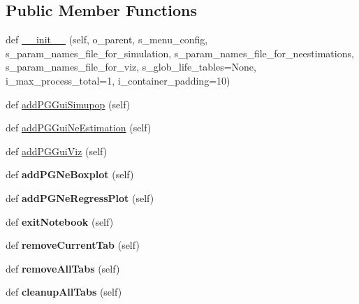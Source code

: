 \subsection*{Public Member Functions}
\begin{DoxyCompactItemize}
\item 
def \hyperlink{classnegui_1_1pghostnotebook_1_1PGHostNotebook_a6d20a73586735a59007c1159361fe000}{\+\_\+\+\_\+init\+\_\+\+\_\+} (self, o\+\_\+parent, s\+\_\+menu\+\_\+config, s\+\_\+param\+\_\+names\+\_\+file\+\_\+for\+\_\+simulation, s\+\_\+param\+\_\+names\+\_\+file\+\_\+for\+\_\+neestimations, s\+\_\+param\+\_\+names\+\_\+file\+\_\+for\+\_\+viz, s\+\_\+glob\+\_\+life\+\_\+tables=None, i\+\_\+max\+\_\+process\+\_\+total=1, i\+\_\+container\+\_\+padding=10)
\item 
def \hyperlink{classnegui_1_1pghostnotebook_1_1PGHostNotebook_af595ed4592e623ef403a5e9e7c1e930e}{add\+P\+G\+Gui\+Simupop} (self)
\item 
def \hyperlink{classnegui_1_1pghostnotebook_1_1PGHostNotebook_a9242f6b6eff030ac5de8db425e1585f9}{add\+P\+G\+Gui\+Ne\+Estimation} (self)
\item 
def \hyperlink{classnegui_1_1pghostnotebook_1_1PGHostNotebook_a66dd928f1054bd004cb21010183b1fd9}{add\+P\+G\+Gui\+Viz} (self)
\item 
def {\bfseries add\+P\+G\+Ne\+Boxplot} (self)\hypertarget{classnegui_1_1pghostnotebook_1_1PGHostNotebook_a23a44451a914eecf4bf49f9695d9a9d8}{}\label{classnegui_1_1pghostnotebook_1_1PGHostNotebook_a23a44451a914eecf4bf49f9695d9a9d8}

\item 
def {\bfseries add\+P\+G\+Ne\+Regress\+Plot} (self)\hypertarget{classnegui_1_1pghostnotebook_1_1PGHostNotebook_a3852820b96adf677e2209180b6983fd4}{}\label{classnegui_1_1pghostnotebook_1_1PGHostNotebook_a3852820b96adf677e2209180b6983fd4}

\item 
def {\bfseries exit\+Notebook} (self)\hypertarget{classnegui_1_1pghostnotebook_1_1PGHostNotebook_a6b399a4627a80141332553e637eab595}{}\label{classnegui_1_1pghostnotebook_1_1PGHostNotebook_a6b399a4627a80141332553e637eab595}

\item 
def {\bfseries remove\+Current\+Tab} (self)\hypertarget{classnegui_1_1pghostnotebook_1_1PGHostNotebook_a722efece7ca42a910310c05dd77a282b}{}\label{classnegui_1_1pghostnotebook_1_1PGHostNotebook_a722efece7ca42a910310c05dd77a282b}

\item 
def {\bfseries remove\+All\+Tabs} (self)\hypertarget{classnegui_1_1pghostnotebook_1_1PGHostNotebook_a1ee591325aa0128d47f46b9faf5ebf9a}{}\label{classnegui_1_1pghostnotebook_1_1PGHostNotebook_a1ee591325aa0128d47f46b9faf5ebf9a}

\item 
def {\bfseries cleanup\+All\+Tabs} (self)\hypertarget{classnegui_1_1pghostnotebook_1_1PGHostNotebook_a78f874aa3ad33e4287dfca4cf23e54f1}{}\label{classnegui_1_1pghostnotebook_1_1PGHostNotebook_a78f874aa3ad33e4287dfca4cf23e54f1}

\end{DoxyCompactItemize}


